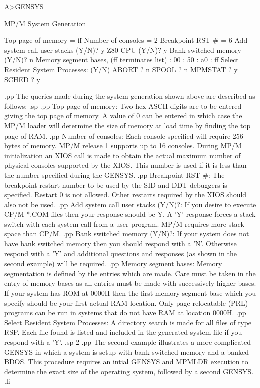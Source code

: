 	A>GENSYS

	MP/M System Generation
	======================

	Top page of memory = ff
	Number of consoles = 2
	Breakpoint RST #   = 6
	Add system call user stacks (Y/N)? y
	Z80 CPU (Y/N)? y
	Bank switched memory (Y/N)? n
	Memory segment bases, (ff terminates list)
	 : 00
	 : 50
	 : a0
	 : ff
	Select Resident System Processes: (Y/N)
	ABORT    ? n
	SPOOL    ? n
	MPMSTAT  ? y
	SCHED    ? y

.pp
The queries made during the system generation shown above are
described as follows:
.sp
.pp
Top page of memory:  Two hex ASCII digits are to be entered giving
the top page of memory.  A value of 0 can be entered in which case
the MP/M loader will determine the size of memory at load time
by finding the top page of RAM.
.pp
Number of consoles:  Each console specified will require 256
bytes of memory.  MP/M release 1 supports up to 16 consoles.
During MP/M initialization an XIOS call is made to obtain the
actual maximum number of physical consoles supported by the
XIOS.  This number is used if it is less than the number specified
during the GENSYS.
.pp
Breakpoint RST #:  The breakpoint restart number to be used by the
SID and DDT debuggers is specified.  Restart 0 is not allowed.
Other restarts required by the XIOS should also not be used.
.pp
Add system call user stacks (Y/N)?:  If you desire to
execute CP/M *.COM files then your response should be Y.  A 'Y'
response forces a stack switch with each system call from a
user program.
MP/M requires more stack space than CP/M.
.pp
Bank switched memory (Y/N)?:  If your system does not have bank switched
memory then you should respond with a 'N'.  Otherwise
respond with a 'Y' and additional questions and responses (as shown in
the second example) will be required.
.pp
Memory segment bases:  Memory segmentation is defined by the
entries which are made.
Care must be taken in the entry of memory bases as all entries
must be made with successively higher bases.
If your system has ROM at 0000H then the first memory segment
base which you specify should be your first actual RAM location.
Only page relocatable (PRL) programs can be run in systems that
do not have RAM at location 0000H.
.pp
Select Resident System Processes:  A directory search is made for
all files of type RSP.  Each file found is listed and included in
the generated system file if you respond with a 'Y'.
.sp 2
.pp
The second example illustrates a more complicated GENSYS in which
a system is setup with bank switched memory and a banked BDOS.
This procedure requires an intial GENSYS and MPMLDR execution to
determine the exact size of the operating system, followed by
a second GENSYS.
.li

